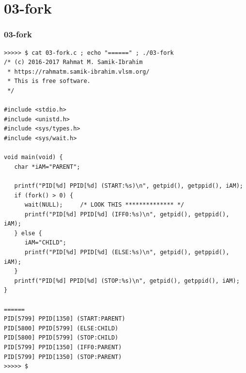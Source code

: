 \documentclass[xcolor=table, notheorems, hyperref={pdfpagelabels=false}]{beamer}
\begin{document}
\section{03-fork}
\begin{frame}[fragile]
\frametitle{03-fork}
\begin{lstlisting}[basicstyle=\ttfamily\tiny]
>>>>> $ cat 03-fork.c ; echo "======" ; ./03-fork 
/* (c) 2016-2017 Rahmat M. Samik-Ibrahim
 * https://rahmatm.samik-ibrahim.vlsm.org/
 * This is free software.
 */

#include <stdio.h>
#include <unistd.h>
#include <sys/types.h>
#include <sys/wait.h>

void main(void) {
   char *iAM="PARENT";
  
   printf("PID[%d] PPID[%d] (START:%s)\n", getpid(), getppid(), iAM);
   if (fork() > 0) {
      wait(NULL);     /* LOOK THIS ************** */
      printf("PID[%d] PPID[%d] (IFF0:%s)\n", getpid(), getppid(), iAM);
   } else {
      iAM="CHILD";
      printf("PID[%d] PPID[%d] (ELSE:%s)\n", getpid(), getppid(), iAM);
   }
   printf("PID[%d] PPID[%d] (STOP:%s)\n", getpid(), getppid(), iAM);
}

======
PID[5799] PPID[1350] (START:PARENT)
PID[5800] PPID[5799] (ELSE:CHILD)
PID[5800] PPID[5799] (STOP:CHILD)
PID[5799] PPID[1350] (IFF0:PARENT)
PID[5799] PPID[1350] (STOP:PARENT)
>>>>> $ 

\end{lstlisting}
\end{frame}

\end{document}
